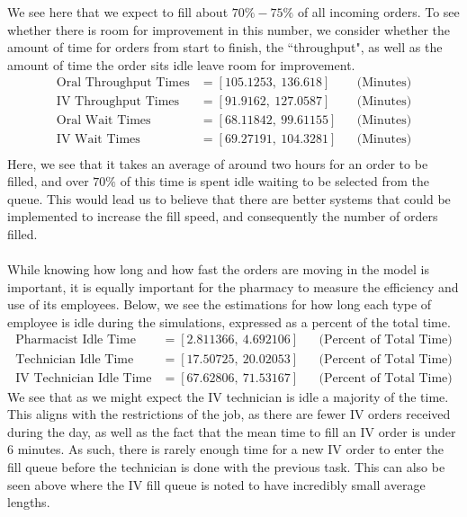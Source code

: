 \documentclass[10pt]{report}            %
\begin{document}
We see here that we expect to fill about $70\%-75\%$ of all incoming orders. To see whether there is room for improvement in this number, we consider whether the amount of time for orders from start to finish, the ``throughput", as well as the amount of time the order sits idle leave room for improvement.
\begin{align*}
\text{Oral Throughput Times} &= [105.1253,\ 136.618] && \text{(Minutes)}\\
\text{IV Throughput Times} &= [91.9162,\ 127.0587] && \text{(Minutes)}\\
\text{Oral Wait Times} &= [68.11842,\ 99.61155] && \text{(Minutes)}\\
\text{IV Wait Times} &= [69.27191,\ 104.3281] && \text{(Minutes)}\\
\end{align*}
Here, we see that it takes an average of around two hours for an order to be filled, and over $70\%$ of this time is spent idle waiting to be selected from the queue. This would lead us to believe that there are better systems that could be implemented to increase the fill speed, and consequently the number of orders filled.\\\hfill\\
While knowing how long and how fast the orders are moving in the model is important, it is equally important for the pharmacy to measure the efficiency and use of its employees. Below, we see the estimations for how long each type of employee is idle during the simulations, expressed as a percent of the total time.
\begin{align*}
\text{Pharmacist Idle Time} &= [2.811366,\ 4.692106] && \text{(Percent of Total Time)}\\
\text{Technician Idle Time} &= [17.50725,\ 20.02053] && \text{(Percent of Total Time)}\\
\text{IV Technician Idle Time} &= [67.62806,\ 71.53167] && \text{(Percent of Total Time)}
\end{align*}
We see that as we might expect the IV technician is idle a majority of the time. This aligns with the restrictions of the job, as there are fewer IV orders received during the day, as well as the fact that the mean time to fill an IV order is under $6$ minutes. As such, there is rarely enough time for a new IV order to enter the fill queue before the technician is done with the previous task. This can also be seen above where the IV fill queue is noted to have incredibly small average lengths.\\\hfill\\
\end{document}
